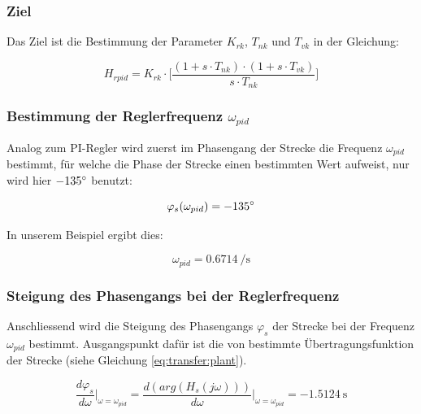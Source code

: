 \subsubsection*{Ziel}
Das Ziel ist  die Bestimmung der Parameter $K_{rk}$, $T_{nk}$  und $T_{vk}$ in
der Gleichung:

\begin{equation} \label{eq:pid:target}
    H_{rpid} = K_{rk} \cdot \biggl[ \frac{(1 + s \cdot T_{nk}) \cdot (1 + s \cdot T_{vk}) }{ s \cdot T_{nk} } \biggr]
\end{equation}


\subsubsection{Bestimmung der Reglerfrequenz $\omega_{pid}$}

Analog  zum PI-Regler  wird zuerst  im  Phasengang der  Strecke die  Frequenz
$\omega_{pid}$ bestimmt, f\"ur  welche die Phase der  Strecke einen bestimmten
Wert aufweist, nur wird hier $-135\degree$ benutzt:

\begin{equation} \label{eq:pid:phi_s}
    \varphi_s(\omega_{pid}) = -135 \degree
\end{equation}

In unserem Beispiel ergibt dies:

\begin{equation} \label{eq:pid:omega_pid}
    \omega_{pid} = \SI{0.6714}{\per\second}
\end{equation}


\subsubsection{Steigung des Phasengangs bei der Reglerfrequenz}

Anschliessend wird  die Steigung des  Phasengangs $\varphi_s$ der  Strecke bei
der  Frequenz  $\omega_{pid}$  bestimmt. Ausgangspunkt  daf\"ur  ist  die  von
 bestimmte  \"Ubertragungsfunktion der Strecke  (siehe Gleichung
\ref{eq:transfer:plant}).

\begin{equation} \label{eq:transfer:plant:derivative}
    \frac{d\varphi_s}{d\omega} \biggr \rvert_{\omega=\omega_{pid}}
        = \frac{d(arg(H_s(j\omega)))}{d\omega} \biggr \rvert_{\omega=\omega_{pid}}
        = \SI{-1.5124}{\second}
\end{equation}


